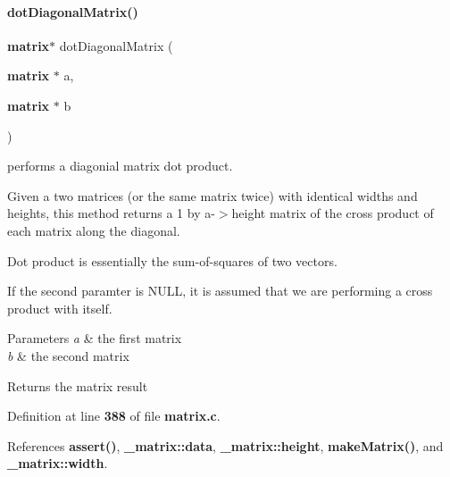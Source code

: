 \paragraph{dot\+Diagonal\+Matrix()}
{\footnotesize\ttfamily \textbf{ matrix}$\ast$ dot\+Diagonal\+Matrix (\begin{DoxyParamCaption}\item[{\textbf{ matrix} $\ast$}]{a,  }\item[{\textbf{ matrix} $\ast$}]{b }\end{DoxyParamCaption})}



performs a diagonial matrix dot product. 

Given a two matrices (or the same matrix twice) with identical widths and heights, this method returns a 1 by a-\/$>$height matrix of the cross product of each matrix along the diagonal.

Dot product is essentially the sum-\/of-\/squares of two vectors.

If the second paramter is N\+U\+LL, it is assumed that we are performing a cross product with itself. 
\begin{DoxyParams}{Parameters}
{\em a} & the first matrix \\
\hline
{\em b} & the second matrix \\
\hline
\end{DoxyParams}
\begin{DoxyReturn}{Returns}
the matrix result 
\end{DoxyReturn}


Definition at line \textbf{ 388} of file \textbf{ matrix.\+c}.



References \textbf{ assert()}, \textbf{ \+\_\+matrix\+::data}, \textbf{ \+\_\+matrix\+::height}, \textbf{ make\+Matrix()}, and \textbf{ \+\_\+matrix\+::width}.


